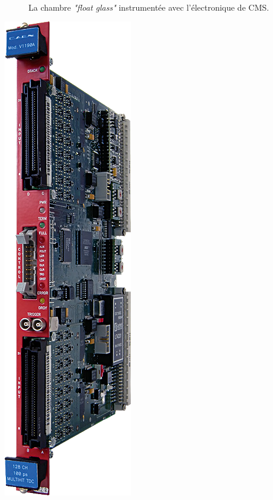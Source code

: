 \begin{figure}[ht]
	 \hfill
	{\,}
	\caption{La chambre \textit{"float glass"} instrumentée avec l'électronique de CMS.}
	\label{chambrefloat}
\end{figure}
\marginpar
{
	\centering
	\includegraphics[width=0.5\marginparwidth]{GLA/TDC.png}
	\label{TDC}
}

